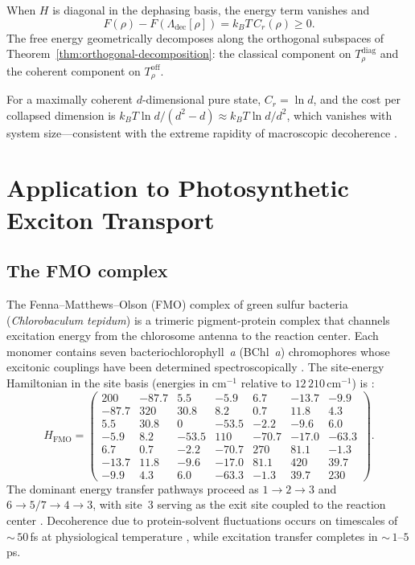 \documentclass[12pt,a4paper]{article}
\theoremstyle{definition}
\theoremstyle{remark}
\begin{document}
When $H$ is diagonal in the dephasing basis, the energy term vanishes and
\begin{equation}
\label{eq:free-energy-diagonal-H}
F(\rho) - F(\Lambda_{\mathrm{dec}}[\rho]) = k_B T\, C_r(\rho) \geq 0.
\end{equation}
The free energy geometrically decomposes along the orthogonal subspaces of Theorem~\ref{thm:orthogonal-decomposition}: the classical component on $T_\rho^{\mathrm{diag}}$ and the coherent component on $T_\rho^{\mathrm{off}}$.

For a maximally coherent $d$-dimensional pure state, $C_r = \ln d$, and the cost per collapsed dimension is $k_B T \ln d/(d^2 - d) \approx k_B T \ln d / d^2$, which vanishes with system size---consistent with the extreme rapidity of macroscopic decoherence \cite{zurek2003decoherence}.

\section{Application to Photosynthetic Exciton Transport}
\label{sec:fmo}

\subsection{The FMO complex}
\label{sec:fmo-complex}

The Fenna--Matthews--Olson (FMO) complex of green sulfur bacteria (\textit{Chlorobaculum tepidum}) is a trimeric pigment-protein complex that channels excitation energy from the chlorosome antenna to the reaction center. Each monomer contains seven bacteriochlorophyll~\textit{a} (BChl~\textit{a}) chromophores whose excitonic couplings have been determined spectroscopically \cite{adolphs2006proteins}. The site-energy Hamiltonian in the site basis (energies in cm$^{-1}$ relative to $12\,210$\,cm$^{-1}$) is \cite{adolphs2006proteins}:
\begin{equation}
\label{eq:fmo-hamiltonian}
H_{\mathrm{FMO}} = \begin{pmatrix}
200 & -87.7 & 5.5 & -5.9 & 6.7 & -13.7 & -9.9 \\
-87.7 & 320 & 30.8 & 8.2 & 0.7 & 11.8 & 4.3 \\
5.5 & 30.8 & 0 & -53.5 & -2.2 & -9.6 & 6.0 \\
-5.9 & 8.2 & -53.5 & 110 & -70.7 & -17.0 & -63.3 \\
6.7 & 0.7 & -2.2 & -70.7 & 270 & 81.1 & -1.3 \\
-13.7 & 11.8 & -9.6 & -17.0 & 81.1 & 420 & 39.7 \\
-9.9 & 4.3 & 6.0 & -63.3 & -1.3 & 39.7 & 230
\end{pmatrix}.
\end{equation}
The dominant energy transfer pathways proceed as $1 \to 2 \to 3$ and $6 \to 5/7 \to 4 \to 3$, with site~3 serving as the exit site coupled to the reaction center \cite{adolphs2006proteins,cao2020quantum}. Decoherence due to protein-solvent fluctuations occurs on timescales of ${\sim}\,50$\,fs at physiological temperature \cite{cao2020quantum}, while excitation transfer completes in ${\sim}\,1$--$5$\,ps.
\end{document}
